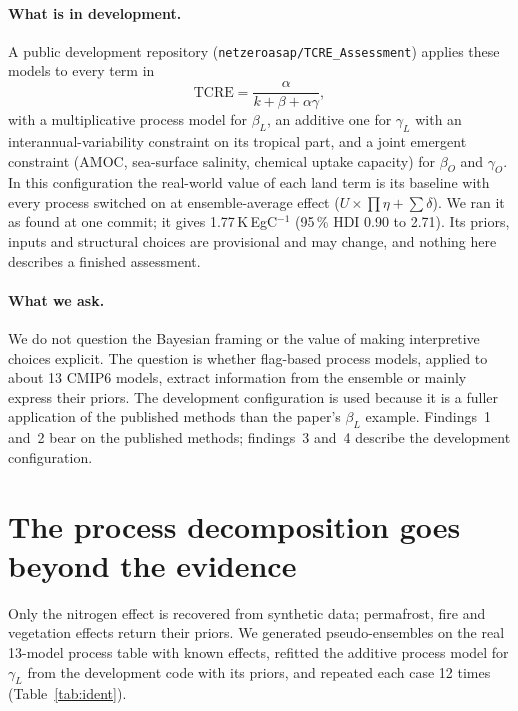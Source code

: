 \documentclass[11pt,a4paper]{article}
\newcommand{\Kpe}{K\,EgC$^{-1}$}
\newcommand{\bL}{$\beta_L$}
\newcommand{\gL}{$\gamma_L$}
\newcommand{\bO}{$\beta_O$}
\newcommand{\gO}{$\gamma_O$}
\begin{document}
\paragraph{What is in development.} A public development repository (\texttt{netzeroasap/TCRE\_Assessment}) applies these models to every term in
\begin{equation}
  \mathrm{TCRE} = \frac{\alpha}{k + \beta + \alpha\gamma},
\end{equation}
with a multiplicative process model for \bL, an additive one for \gL{} with an interannual-variability constraint on its tropical part, and a joint emergent constraint (AMOC, sea-surface salinity, chemical uptake capacity) for \bO{} and \gO. In this configuration the real-world value of each land term is its baseline with every process switched on at ensemble-average effect ($U \times \prod\eta + \sum\delta$). We ran it as found at one commit; it gives 1.77\,\Kpe{} (95\,\% HDI 0.90 to 2.71). Its priors, inputs and structural choices are provisional and may change, and nothing here describes a finished assessment.

\paragraph{What we ask.} We do not question the Bayesian framing or the value of making interpretive choices explicit. The question is whether flag-based process models, applied to about 13 CMIP6 models, extract information from the ensemble or mainly express their priors. The development configuration is used because it is a fuller application of the published methods than the paper's \bL{} example. Findings~1 and~2 bear on the published methods; findings~3 and~4 describe the development configuration.

\section{The process decomposition goes beyond the evidence}
\label{sec:ident}

Only the nitrogen effect is recovered from synthetic data; permafrost, fire and vegetation effects return their priors. We generated pseudo-ensembles on the real 13-model process table with known effects, refitted the additive process model for \gL{} from the development code with its priors, and repeated each case 12 times (Table~\ref{tab:ident}).
\end{document}
